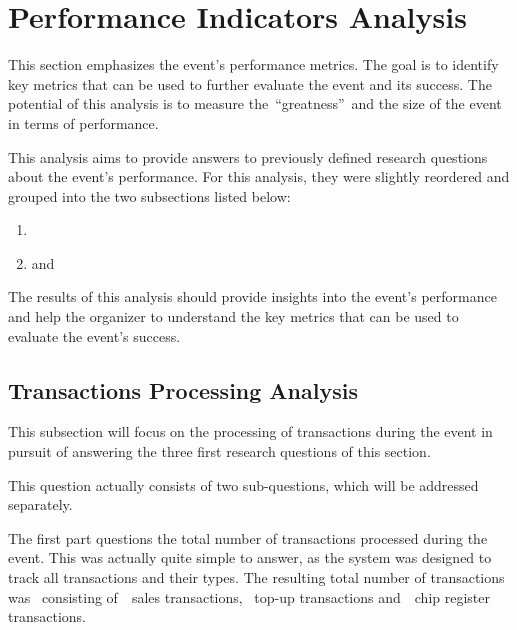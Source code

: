 

\section{Performance Indicators Analysis}
\label{sec:analysis-performance-indicators}

This section emphasizes the event's performance metrics.
The goal is to identify key metrics that can be used to further evaluate the event and its success.
The potential of this analysis is to measure the~\enquote{greatness}~and the size of the event in terms of performance.

This analysis aims to provide answers to previously defined research questions about the event's performance.
For this analysis, they were slightly reordered and grouped into the two subsections listed below:
\begin{enumerate}
	\item {}
	\item and~
\end{enumerate}

The results of this analysis should provide insights into the event's performance and help the organizer to understand the key metrics that can be used to evaluate the event's success.


\subsection{Transactions Processing Analysis}
\label{subsec:analysis-performance-indicators-transactions}

This subsection will focus on the processing of transactions during the event in pursuit of answering the three first research questions of this section.


This question actually consists of two sub-questions, which will be addressed separately.

The first part questions the total number of transactions processed during the event.
This was actually quite simple to answer, as the system was designed to track all transactions and their types.
The resulting total number of transactions was~ consisting of~~sales transactions, ~top-up transactions and~~chip register transactions.

